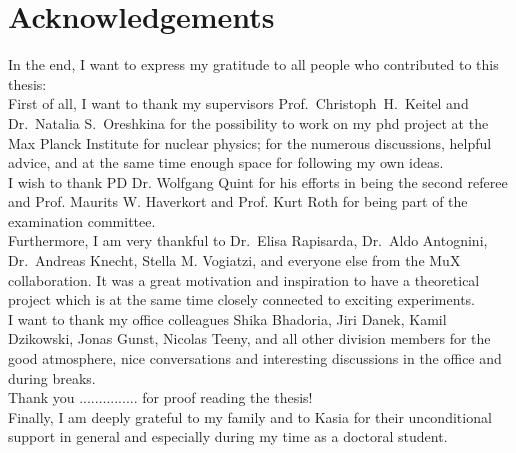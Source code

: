 \chapter*{Acknowledgements}

In the end, I want to express my gratitude to all people who contributed to this thesis:\\
First of all, I want to thank my supervisors Prof.~Christoph~H.~Keitel and Dr.~Natalia S.~Oreshkina for the possibility to work on my phd project at the Max Planck Institute for nuclear physics; for the numerous discussions, helpful advice, and at the same time enough space for following my own ideas.\\
I wish to thank PD Dr. Wolfgang Quint for his efforts in being the second referee and Prof. Maurits W. Haverkort and Prof. Kurt Roth for being part of the examination committee.\\
Furthermore, I am very thankful to Dr.~Elisa Rapisarda, Dr.~Aldo Antognini, Dr.~Andreas Knecht, Stella M. Vogiatzi, and everyone else from the MuX collaboration. It was a great motivation and inspiration to have a theoretical project which is at the same time closely connected to exciting experiments.\\
I want to thank my  office colleagues Shika Bhadoria, Jiri Danek, Kamil Dzikowski, Jonas Gunst, Nicolas Teeny, and all other division members for the good atmosphere, nice conversations and interesting discussions in the office and during breaks.\\
Thank you ............... for proof reading the thesis!\\
Finally, I am deeply grateful to my family and to Kasia for their unconditional support in general and especially during my time as a doctoral student.
%



